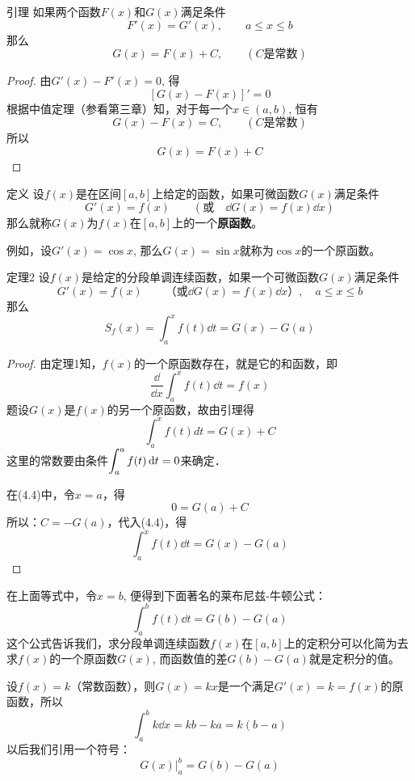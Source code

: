 \begin{blk}
    {引理} 如果两个函数$F(x)$和$G(x)$满足条件
\[F' (x) =G' (x) ,\qquad a\le x\le b\]
那么
\[G(x)=F(x)+C,\qquad (C\text{是常数})\]
\end{blk}

\begin{proof}
    由$G'(x)-F'(x)=0$, 得
\[[G (x) -F (x) ]'=0\]
根据中值定理（参看第三章）知，对于每一个$x\in (a,b)$, 恒有
\[G(x)-F(x)=C,\qquad (C\text{是常数})\]
所以
\[G (x) =F (x) +C\]
\end{proof}

\begin{blk}
 {定义} 设$f(x)$是在区间$[a,b]$上给定的函数，如果可微函数$G(x)$满足条件
\[G'(x)=f(x)\qquad (\text{或}\quad \dd G(x)=f(x)\dd x)\]
那么就称$G(x)$为$f(x)$在$[a,b]$上的一个\textbf{原函数}。
\end{blk}

例如，设$G'(x)=\cos x$, 那么$G(x)=\sin x$就称为$\cos x$的一个原函数。

\begin{blk}
    {定理2} 设$f(x)$是给定的分段单调连续函数，如果一个可微函数$G(x)$满足条件
\begin{equation}
    G'(x)=f(x)\qquad \text{（或$\dd G(x)=f(x)\dd x$）},\quad a\le x\le b
\end{equation}    
那么
\[S_f (x)=\int^x_a  f (t) \dd t=G (x) -G (a) \]
\end{blk}

\begin{proof}
    由定理1知，$f(x)$的一个原函数存在，就是它的和函数，即
\[\frac{\dd }{\dd x}\int^x_a f(t)\dd t=f(x)\]
题设$G(x)$是$f(x)$的另一个原函数，故由引理得
\begin{equation}
    \int^x_a    f (t) dt=G (x) +C 
\end{equation}
这里的常数要由条件$\displaystyle\int^a_a f(t)\,{\rm d} t=0$来确定．

在(4.4)中，令$x=a$，得
\[0=G(a)+C\]
所以：$C=-G(a)$，代入(4.4)，得
\[\int^x_a f(t)\dd t=G(x)-G(a)\]
\end{proof}

在上面等式中，令$x=b$, 便得到下面著名的莱布尼兹-牛顿公式：
\[\int^b_a f (t) \dd t= G (b) -G (a) \]
这个公式告诉我们，求分段单调连续函数$f(x)$在$[a,b]$上的定积分可以化简为去求$f(x)$的一个原函数$G(x)$, 而函数值的差$G(b)-G(a)$就是定积分的值。

\begin{example}
    设$f(x)=k$（常数函数），则$G(x)=kx$是一个满足$G'(x)=k=f(x)$的原函数，所以
\[\int^b_a k\dd x=kb-ka=k(b-a)\]
以后我们引用一个符号：
\[G(x)\Bigg|^b_a=G(b)-G(a)\]
\end{example}

